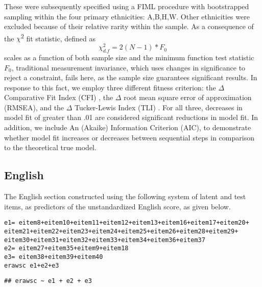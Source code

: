 \documentclass{article}\usepackage[]{graphicx}\usepackage[]{color}
\makeatletter
\newcommand{\hlopt}[1]{\textcolor[rgb]{0,0,0}{#1}}%
\newcommand{\hlstd}[1]{\textcolor[rgb]{0.345,0.345,0.345}{#1}}%
\newcommand{\hlkwb}[1]{\textcolor[rgb]{0.69,0.353,0.396}{#1}}%
\newenvironment{kframe}{%
 \def\at@end@of@kframe{}%
 \ifinner\ifhmode%
  \def\at@end@of@kframe{\end{minipage}}%
  \begin{minipage}{\columnwidth}%
 \fi\fi%
 \def\FrameCommand##1{\hskip\@totalleftmargin \hskip-\fboxsep
 \colorbox{shadecolor}{##1}\hskip-\fboxsep
     \hskip-\linewidth \hskip-\@totalleftmargin \hskip\columnwidth}%
 \MakeFramed {\advance\hsize-\width
   \@totalleftmargin\z@ \linewidth\hsize
   \@setminipage}}%
 {\par\unskip\endMakeFramed%
 \at@end@of@kframe}
\newenvironment{knitrout}{}{} %
\makeatother
\begin{document}
These were subsequently specified using a FIML procedure with bootstrapped sampling within the four primary ethnicities: A,B,H,W. Other ethnicities were excluded because of their relative rarity within the sample. As a consequence of the $\chi$\textsuperscript{2} fit statistic, defined as \begin{equation} \chi^2_{d.f}=2(N-1) * F_0 \end{equation} scales as a function of both sample size and the minimum function test statistic $F_0$, traditional measurement invariance, which uses changes in significance to reject a constraint, fails here, as the sample size guarantees significant results. In response to this fact, we employ three different fitness criterion: the $\Delta$ Comparative Fit Index (CFI) \cite{Bentler}, the $\Delta$ root mean square error of approximation (RMSEA), and the $\Delta$ Tucker-Lewis Index (TLI) \cite{Chen}. For all three, decreases in model fit of greater than .01 are considered significant reductions in model fit. In addition, we include An (Akaike) Information Criterion (AIC), to demonstrate whether model fit increases or decreases between sequential steps in comparison to the theoretical true model.

\subsection{English}
The English section constructed using the following system of latent and test items, as predictors of the unstandardized English score, as given below.
\begin{knitrout}
\color{fgcolor}\begin{kframe}
\begin{alltt}
\hlstd{e1} \hlkwb{=} \hlopt{~}\hlstd{eitem8} \hlopt{+} \hlstd{eitem10} \hlopt{+} \hlstd{eitem11} \hlopt{+} \hlstd{eitem12} \hlopt{+} \hlstd{eitem13} \hlopt{+} \hlstd{eitem16} \hlopt{+} \hlstd{eitem17} \hlopt{+} \hlstd{eitem20} \hlopt{+}
    \hlstd{eitem21} \hlopt{+} \hlstd{eitem22} \hlopt{+} \hlstd{eitem23} \hlopt{+} \hlstd{eitem24} \hlopt{+} \hlstd{eitem25} \hlopt{+} \hlstd{eitem26} \hlopt{+} \hlstd{eitem28} \hlopt{+} \hlstd{eitem29} \hlopt{+}
    \hlstd{eitem30} \hlopt{+} \hlstd{eitem31} \hlopt{+} \hlstd{eitem32} \hlopt{+} \hlstd{eitem33} \hlopt{+} \hlstd{eitem34} \hlopt{+} \hlstd{eitem36} \hlopt{+} \hlstd{eitem37}
\hlstd{e2} \hlkwb{=} \hlopt{~}\hlstd{eitem27} \hlopt{+} \hlstd{eitem35} \hlopt{+} \hlstd{eitem9} \hlopt{+} \hlstd{eitem18}
\hlstd{e3} \hlkwb{=} \hlopt{~}\hlstd{eitem38} \hlopt{+} \hlstd{eitem39} \hlopt{+} \hlstd{eitem40}
\hlstd{erawsc} \hlopt{~} \hlstd{e1} \hlopt{+} \hlstd{e2} \hlopt{+} \hlstd{e3}
\end{alltt}
\begin{verbatim}
## erawsc ~ e1 + e2 + e3
\end{verbatim}
\end{kframe}
\end{knitrout}
\end{document}
